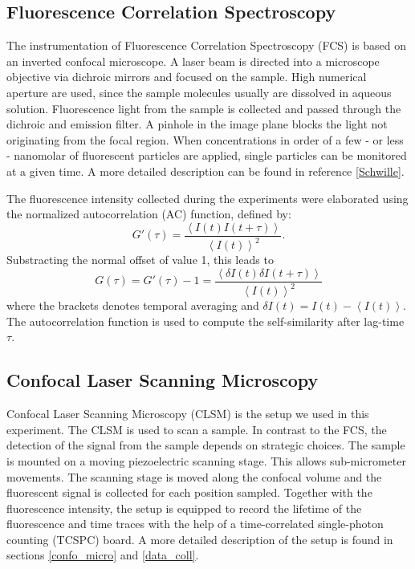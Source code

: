 \documentclass[twoside,single]{lion-msc}
\begin{document}
\subsection{Fluorescence Correlation Spectroscopy}
The instrumentation of Fluorescence Correlation Spectroscopy (FCS) is based on an inverted confocal microscope.  A laser beam is directed into a microscope objective via dichroic mirrors and focused on the sample. High numerical aperture are used, since the sample molecules usually are dissolved in aqueous solution. Fluorescence light from the sample is collected and passed through the dichroic and emission filter. A pinhole in the image plane blocks the light not originating from the focal region. When concentrations in order of a few - or less - nanomolar of fluorescent particles are applied, single particles can be monitored at a given time. A more detailed description can be found in reference \ref{Schwille}.

The fluorescence intensity collected during the experiments were elaborated using the normalized autocorrelation (AC) function, defined by:
\begin{equation}
G'(\tau) = \frac{\left \langle I(t)I(t + \tau) \right \rangle}{\left \langle I(t)\right \rangle ^{2}}.
\end{equation}
Substracting the normal offset of value 1, this leads to
\begin{equation} \label{AC}
G(\tau) = G'(\tau) - 1 =  \frac{\left \langle \delta I(t)\delta I(t + \tau) \right \rangle}{\left \langle I(t)\right \rangle ^{2}}
\end{equation}
where the brackets  denotes temporal averaging and $\delta I(t) = I(t) - \left \langle I(t)\right \rangle$. The autocorrelation function is used to compute the self-similarity after lag-time $\tau$.

\subsection{Confocal Laser Scanning Microscopy}
Confocal Laser Scanning Microscopy (CLSM) is the setup we used in this experiment. The CLSM is used to scan a sample. In contrast to the FCS, the detection of the signal from the sample depends on strategic choices. The sample is mounted on a moving piezoelectric scanning stage. This allows sub-micrometer movements. The scanning stage is moved along the confocal volume and the fluorescent signal is collected for each position sampled. Together with the fluorescence intensity, the setup is equipped to record the lifetime of the fluorescence and time traces with the help of a time-correlated single-photon counting (TCSPC) board. A more detailed description of the setup is found in sections \ref{confo_micro} and \ref{data_coll}.
\end{document}
